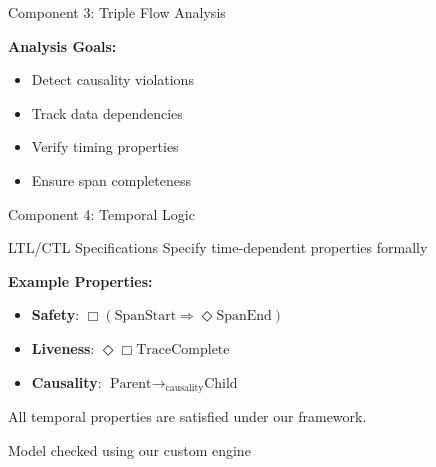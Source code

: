 \documentclass[aspectratio=169,xcolor=dvipsnames]{beamer}
\begin{document}
\begin{frame}{Component 3: Triple Flow Analysis}
\begin{center}
\end{center}

\vspace{1em}
\textbf{Analysis Goals:}
\begin{itemize}
    \item Detect causality violations
    \item Track data dependencies
    \item Verify timing properties
    \item Ensure span completeness
\end{itemize}
\end{frame}

\begin{frame}{Component 4: Temporal Logic}
\begin{block}{LTL/CTL Specifications}
Specify time-dependent properties formally
\end{block}

\textbf{Example Properties:}
\begin{itemize}
    \item \textbf{Safety}: $\Box(\text{SpanStart} \Rightarrow \Diamond \text{SpanEnd})$
    \item \textbf{Liveness}: $\Diamond \Box \text{TraceComplete}$
    \item \textbf{Causality}: $\text{Parent} \to_{\text{causality}} \text{Child}$
\end{itemize}

\vspace{1em}
\begin{theorem}
All temporal properties are satisfied under our framework.
\end{theorem}

\footnotesize{Model checked using our custom engine}
\end{frame}
\end{document}
